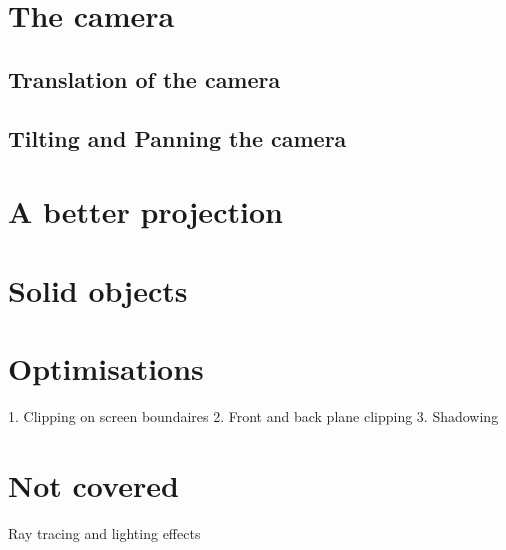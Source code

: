 \documentclass[12pt]{article}
\begin{document}
\section{The camera}
\subsection{Translation of the camera}
\subsection{Tilting and Panning the camera}

\section{A better projection}


\section{Solid objects}


\section{Optimisations}
1. Clipping on screen boundaires
2. Front and back plane clipping
3. Shadowing

\section{Not covered}
Ray tracing and lighting effects

\end{document}
